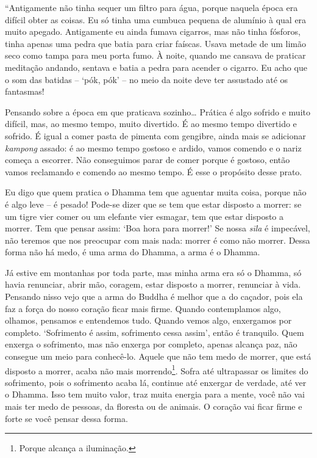 ``Antigamente não tinha sequer um filtro para água, porque naquela época
era difícil obter as coisas. Eu só tinha uma cumbuca pequena de alumínio
à qual era muito apegado. Antigamente eu ainda fumava cigarros, mas não
tinha fósforos, tinha apenas uma pedra que batia para criar faíscas.
Usava metade de um limão seco como tampa para meu porta fumo. À noite,
quando me cansava de praticar meditação andando, sentava e batia a pedra
para acender o cigarro. Eu acho que o som das batidas -- `pók, pók' --
no meio da noite deve ter assustado até os fantasmas!

Pensando sobre a época em que praticava sozinho\ldots{} Prática é algo
sofrido e muito difícil, mas, ao mesmo tempo, muito divertido. É ao
mesmo tempo divertido e sofrido. É igual a comer pasta de pimenta com
gengibre, ainda mais se adicionar \emph{kampong} assado: é ao mesmo
tempo gostoso e ardido, vamos comendo e o nariz começa a escorrer. Não
conseguimos parar de comer porque é gostoso, então vamos reclamando e
comendo ao mesmo tempo. É esse o propósito desse prato.

Eu digo que quem pratica o Dhamma tem que aguentar muita coisa, porque
não é algo leve -- é pesado! Pode-se dizer que se tem que estar disposto
a morrer: se um tigre vier comer ou um elefante vier esmagar, tem que
estar disposto a morrer. Tem que pensar assim: `Boa hora para morrer!'
Se nossa \emph{sīla} é impecável, não teremos que nos preocupar com mais
nada: morrer é como não morrer. Dessa forma não há medo, é uma arma do
Dhamma, a arma é o Dhamma.

Já estive em montanhas por toda parte, mas minha arma era só o Dhamma,
só havia renunciar, abrir mão, coragem, estar disposto a morrer,
renunciar à vida. Pensando nisso vejo que a arma do Buddha é melhor que
a do caçador, pois ela faz a força do nosso coração ficar mais firme.
Quando contemplamos algo, olhamos, pensamos e entendemos tudo. Quando
vemos algo, enxergamos por completo. `Sofrimento é assim, sofrimento
cessa assim', então é tranquilo. Quem enxerga o sofrimento, mas não
enxerga por completo, apenas alcança paz, não consegue um meio para
conhecê-lo. Aquele que não tem medo de morrer, que está disposto a
morrer, acaba não mais morrendo\footnote{Porque alcança a iluminação.}.
Sofra até ultrapassar os limites do sofrimento, pois o sofrimento acaba
lá, continue até enxergar de verdade, até ver o Dhamma. Isso tem muito
valor, traz muita energia para a mente, você não vai mais ter medo de
pessoas, da floresta ou de animais. O coração vai ficar firme e forte se
você pensar dessa forma.

